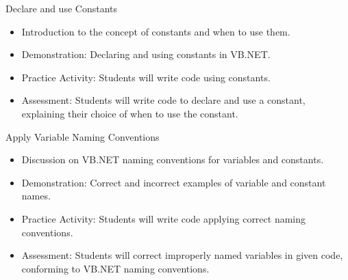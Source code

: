 \documentclass[main.tex]{subfiles}
\begin{document}
{Declare and use Constants}
{ \begin{itemize}
  \item Introduction to the concept of constants and when to use them.
  \item Demonstration: Declaring and using constants in VB.NET.
  \item Practice Activity: Students will write code using constants.
  \item Assessment: Students will write code to declare and use a constant, explaining their choice of when to use the constant.
\end{itemize}
}
{}

{Apply Variable Naming Conventions}
{ \begin{itemize}
  \item Discussion on VB.NET naming conventions for variables and constants.
  \item Demonstration: Correct and incorrect examples of variable and constant names.
  \item Practice Activity: Students will write code applying correct naming conventions.
  \item Assessment: Students will correct improperly named variables in given code, conforming to VB.NET naming conventions.
\end{itemize}
}
{}
\end{document}
